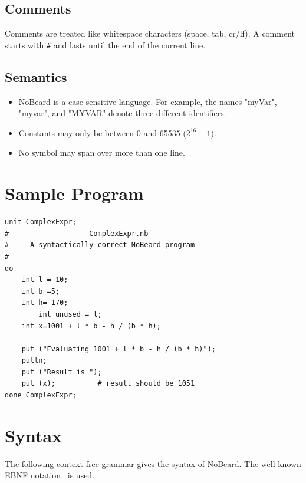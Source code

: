 \documentclass[11pt]{report}
\newcommand{\leongage}{NoBeard}
\begin{document}
\subsection{Comments}
Comments are treated like whitespace characters (space, tab, cr/lf). A comment starts with \lstinline$#$ and lasts until the end of the current line.

\subsection{Semantics}
\begin{itemize}
	\item \leongage{} is a case sensitive language. For example, the names "myVar", "myvar", and "MYVAR" denote three different identifiers.
	\item Constants may only be between 0 and 65535 ($2^{16} - 1$).
	\item No symbol may span over more than one line.
\end{itemize}

\section{Sample Program}
\lstset{language=NoBeard}

\begin{lstlisting}
unit ComplexExpr;
# ----------------- ComplexExpr.nb ----------------------
# --- A syntactically correct NoBeard program
# -------------------------------------------------------
do
    int l = 10;
    int b =5;
    int h= 170;
        int unused = l;
    int x=1001 + l * b - h / (b * h);

    put ("Evaluating 1001 + l * b - h / (b * h)");
    putln;
    put ("Result is ");
    put (x);          # result should be 1051
done ComplexExpr;
\end{lstlisting}

\section{Syntax}
The following context free grammar gives the syntax of \leongage{}. The well-known EBNF notation~\cite{wirth_what_1977} is used.
\end{document}
